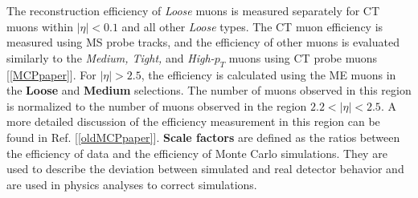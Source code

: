 The reconstruction efficiency of \textit{Loose} muons is measured separately for CT muons within $|\eta| < 0.1$ and all other \textit{Loose} types. The CT muon efficiency is measured using MS probe tracks, and the efficiency of other muons is evaluated similarly to the \textit{Medium, Tight,} and \textit{High-$p_T$} muons using CT probe muons [\ref{MCPpaper}].
For $|\eta| > 2.5$, the efficiency is calculated using the ME muons in the \textbf{Loose} and \textbf{Medium} selections. The number of muons observed in this region is normalized to the number of muons observed in the region $2.2 < |\eta| < 2.5$. A more detailed discussion of the efficiency measurement in this region can be found in Ref. [\ref{oldMCPpaper}]. 
\textbf{Scale factors} are defined as the ratios between the efficiency of data and the efficiency of Monte Carlo simulations. They are used to describe the deviation between simulated and real detector behavior and are used in physics analyses to correct simulations. 
